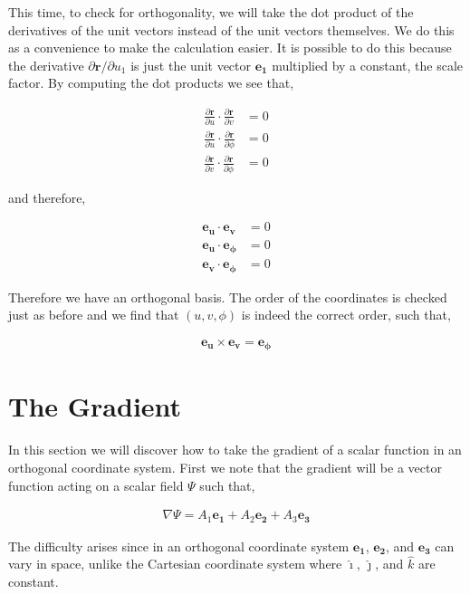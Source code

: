 \documentclass[11pt]{amsart}
\begin{document}
This time, to check for orthogonality, we will take the dot product of the derivatives of the unit vectors instead of the unit vectors themselves. We do this as a convenience to make the calculation easier. It is possible to do this because the derivative $\partial \mathbf{r} / \partial u_1$ is just the unit vector $\mathbf{e_1}$ multiplied by a constant, the scale factor. By computing the dot products we see that,

\begin{align*}
  \frac{\partial\mathbf{r}}{\partial u}\cdot\frac{\partial\mathbf{r}}{\partial v} &= 0 \\
  \frac{\partial\mathbf{r}}{\partial u}\cdot\frac{\partial\mathbf{r}}{\partial \phi} &= 0 \\
  \frac{\partial\mathbf{r}}{\partial v}\cdot\frac{\partial\mathbf{r}}{\partial \phi} &= 0
\end{align*}

and therefore,

\begin{align*}
  \mathbf{e_u}\cdot\mathbf{e_v} &= 0 \\
  \mathbf{e_u}\cdot\mathbf{e_{\phi}} &= 0 \\
  \mathbf{e_v}\cdot\mathbf{e_{\phi}} &= 0
\end{align*}

Therefore we have an orthogonal basis. The order of the coordinates is checked just as before and we find that $(u, v, \phi)$ is indeed the correct order, such that,

\begin{align*}
  \mathbf{e_u}\times\mathbf{e_v}=\mathbf{e_{\phi}}
\end{align*}

\section{The Gradient}

In this section we will discover how to take the gradient of a scalar function in an orthogonal coordinate system. First we note that the gradient will be a vector function acting on a scalar field $\Psi$ such that,

\begin{align*}
  \nabla\Psi = A_1 \mathbf{e_1} + A_2 \mathbf{e_2} + A_3 \mathbf{e_3}
\end{align*}

The difficulty arises since in an orthogonal coordinate system $\mathbf{e_1}$, $\mathbf{e_2}$, and $\mathbf{e_3}$ can vary in space, unlike the Cartesian coordinate system where $\hat{\imath}$, $\hat{\jmath}$, and $\hat{k}$ are constant.
\end{document}
